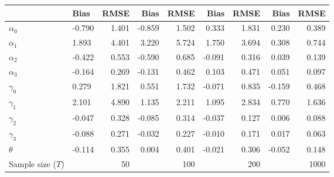 
\begin{tabular}[t]{llrrrrrrr}
\toprule
  & Bias & RMSE & Bias & RMSE & Bias & RMSE & Bias & RMSE\\
\midrule
$\alpha_{0}$ & -0.790 & 1.401 & -0.859 & 1.502 & 0.333 & 1.831 & 0.230 & 0.389\\
$\alpha_{1}$ & 1.893 & 4.401 & 3.220 & 5.724 & 1.750 & 3.694 & 0.308 & 0.744\\
$\alpha_{2}$ & -0.422 & 0.553 & -0.590 & 0.685 & -0.091 & 0.316 & 0.039 & 0.139\\
$\alpha_{3}$ & -0.164 & 0.269 & -0.131 & 0.462 & 0.103 & 0.471 & 0.051 & 0.097\\
$\gamma_{0}$ & 0.279 & 1.821 & 0.551 & 1.732 & -0.071 & 0.835 & -0.159 & 0.468\\
$\gamma_{1}$ & 2.101 & 4.890 & 1.135 & 2.211 & 1.095 & 2.834 & 0.770 & 1.636\\
$\gamma_{2}$ & -0.047 & 0.328 & -0.085 & 0.314 & -0.037 & 0.127 & 0.006 & 0.088\\
$\gamma_{3}$ & -0.088 & 0.271 & -0.032 & 0.227 & -0.010 & 0.171 & 0.017 & 0.063\\
$\theta$ & -0.114 & 0.355 & 0.004 & 0.401 & -0.021 & 0.306 & -0.052 & 0.148\\
Sample size ($T$) &  & 50 &  & 100 &  & 200 &  & 1000\\
\bottomrule
\end{tabular}
